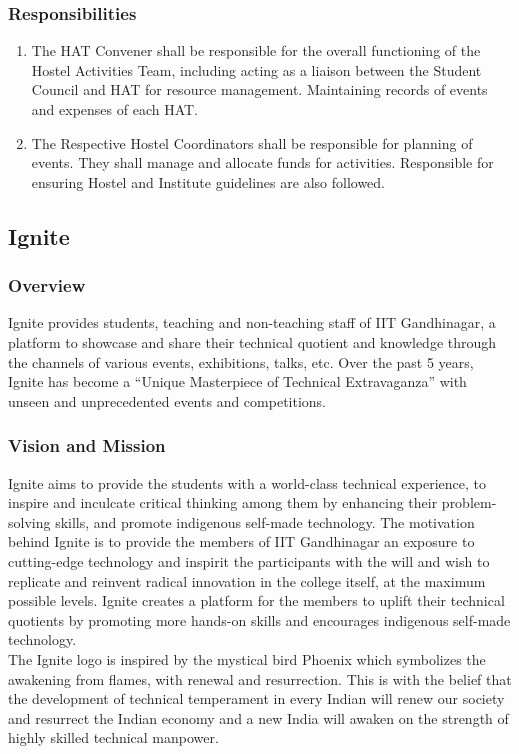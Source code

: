 \documentclass[12pt]{article}
\begin{document}
\subsubsection{Responsibilities}
\begin{enumerate}
    \item The HAT Convener shall be responsible for the overall functioning of the Hostel Activities Team, including acting as a liaison between the Student Council and HAT for resource management. Maintaining records of events and expenses of each HAT.
    \item The Respective Hostel Coordinators shall be responsible for planning of events. They shall manage and allocate funds for activities. Responsible for ensuring Hostel and Institute guidelines are also followed.
\end{enumerate}

\subsection{Ignite}
\subsubsection{Overview}
Ignite provides students, teaching and non-teaching staff of IIT Gandhinagar, a platform to showcase and share their technical quotient and knowledge through the channels of various events, exhibitions, talks, etc. Over the past 5 years, Ignite has become a “Unique Masterpiece of Technical Extravaganza” with unseen and unprecedented events and competitions.

\subsubsection{Vision and Mission}
Ignite aims to provide the students with a world-class technical experience, to inspire and inculcate critical thinking among them by enhancing their problem-solving skills, and promote indigenous self-made technology. The motivation behind Ignite is to provide the members of IIT Gandhinagar an exposure to cutting-edge technology and inspirit the participants with the will and wish to replicate and reinvent radical innovation in the college itself, at the maximum possible levels. Ignite creates a platform for the members to uplift their technical quotients by promoting more hands-on skills and encourages indigenous self-made technology.\\

\noindent The Ignite logo is inspired by the mystical bird Phoenix which symbolizes the awakening from flames, with renewal and resurrection. This is with the belief that the development of technical temperament in every Indian will renew our society and resurrect the Indian economy and a new India will awaken on the strength of highly skilled technical manpower.
\end{document}
